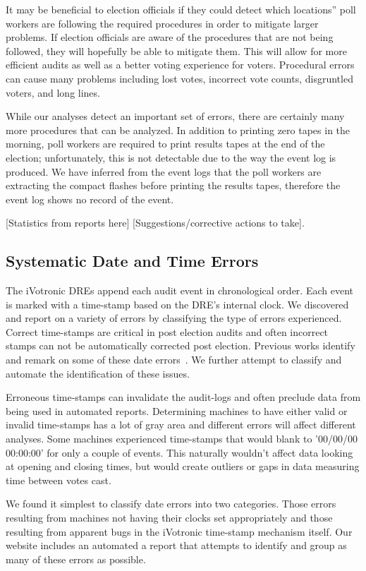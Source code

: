 It may be beneficial to election officials if they could detect which locations'' poll workers are following the required procedures in order to mitigate larger problems.  If election officials are aware of the procedures that are not being followed, they will hopefully be able to mitigate them.  This will allow for more efficient audits as well as a better voting experience for voters.  Procedural errors can cause many problems including lost votes, incorrect vote counts, disgruntled voters, and long lines.

While our analyses detect an important set of errors, there are certainly many more procedures that can be analyzed.  In addition to printing zero tapes in the morning, poll workers are required to print results tapes at the end of the election; unfortunately, this is not detectable due to the way the event log is produced.  We have inferred from the event logs that the poll workers are extracting the compact flashes before printing the results tapes, therefore the event log shows no record of the event.  

[Statistics from reports here] [Suggestions/corrective actions to take].

\subsection{Systematic Date and Time Errors}
The iVotronic DREs append each audit event in chronological order.  Each event is marked with a time-stamp based on the DRE's internal clock.  We discovered and report on a variety of errors by classifying the type of errors experienced. Correct time-stamps are critical in post election audits and often incorrect stamps can not be automatically corrected post election.  Previous works identify and remark on some of these date errors~\cite{Buell2011,Sandler2007}.  We further attempt to classify and automate the identification of these issues.

Erroneous time-stamps can invalidate the audit-logs and often preclude data from being used in automated reports.  Determining machines to have either valid or invalid time-stamps has a lot of gray area and different errors will affect different analyses.  Some machines experienced time-stamps that would blank to '00/00/00 00:00:00' for only a couple of events.  This naturally wouldn't affect data looking at opening and closing times, but would create outliers or gaps in data measuring time between votes cast.  

We found it simplest to classify date errors into two categories.  Those errors resulting from machines not having their clocks set appropriately and those resulting from apparent bugs in the iVotronic time-stamp mechanism itself.  Our website includes an automated a report that attempts to identify and group as many of these errors as possible.

